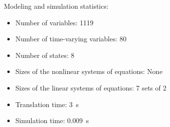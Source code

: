 \begin{contextbox}
  Modeling and simulation statistics:
  \begin{itemize}
    \item Number of variables: 1119
    \item Number of time-varying variables: 80
    \item Number of states: 8
    \item Sizes of the nonlinear systems of equations: None
    \item Sizes of the linear systems of equations: 7 sets of 2
    \item Translation time: \SI{3}{s}
    \item Simulation time: \SI{0.009}{s}
  \end{itemize}
\end{contextbox}